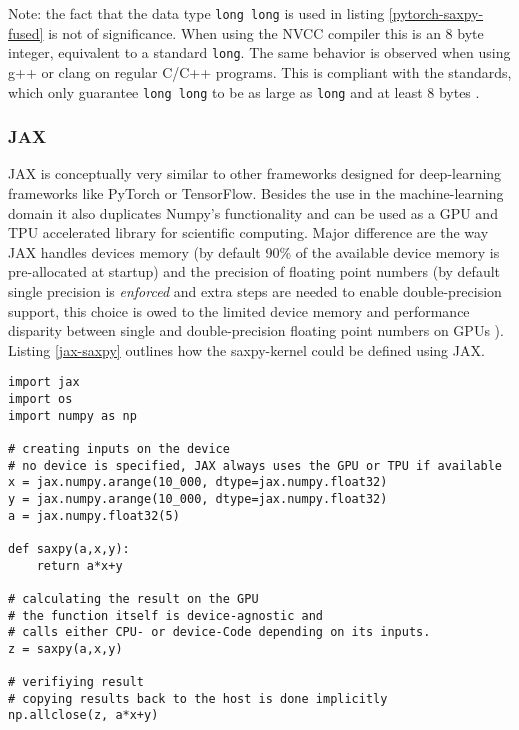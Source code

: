\documentclass[english,11pt,a4paper,table]{article} %
\begin{document}
Note: the fact that the data type \texttt{long long} is used in listing \ref{pytorch-saxpy-fused} is not of significance.
When using the NVCC compiler this is an 8 byte integer, equivalent to a standard \texttt{long}.
The same behavior is observed when using g++ or clang on regular C/C++ programs.
This is compliant with the standards, which only guarantee \texttt{long long} to be as large as \texttt{long} and at least 8 bytes \cite{Fundamen16:online}.

\subsubsection{JAX}

JAX is conceptually very similar to other frameworks designed for deep-learning frameworks like PyTorch or TensorFlow.
Besides the use in the machine-learning domain it also duplicates Numpy's functionality and can be used as a GPU and TPU accelerated library for scientific computing.
Major difference are the way JAX handles devices memory (by default 90\% of the available device memory is pre-allocated at startup) and the precision of floating point numbers (by default single precision is \emph{enforced} and extra steps are needed to enable double-precision support, this choice is owed to the limited device memory and performance disparity between single and double-precision floating point numbers on GPUs \cite{JAXThe45:online}).
Listing \ref{jax-saxpy} outlines how the saxpy-kernel could be defined using JAX.

\begin{verbatim}
import jax
import os
import numpy as np

# creating inputs on the device
# no device is specified, JAX always uses the GPU or TPU if available
x = jax.numpy.arange(10_000, dtype=jax.numpy.float32)
y = jax.numpy.arange(10_000, dtype=jax.numpy.float32)
a = jax.numpy.float32(5)

def saxpy(a,x,y):
    return a*x+y

# calculating the result on the GPU
# the function itself is device-agnostic and 
# calls either CPU- or device-Code depending on its inputs.
z = saxpy(a,x,y)

# verifiying result
# copying results back to the host is done implicitly 
np.allclose(z, a*x+y)
\end{verbatim}
\end{document}
